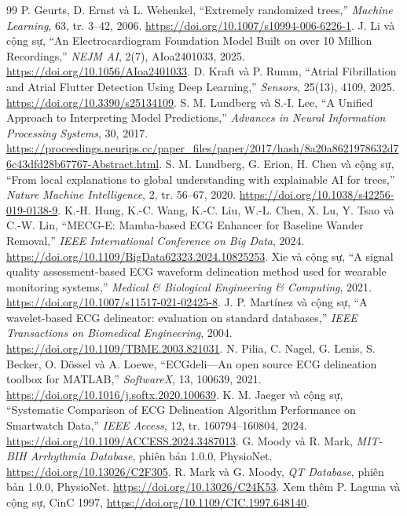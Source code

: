 \documentclass[12pt,a4paper,oneside]{report}
\begin{document}
\begin{thebibliography}{99}
 P. Geurts, D. Ernst và L. Wehenkel, ``Extremely randomized trees,'' \emph{Machine Learning}, 63, tr. 3--42, 2006. \url{https://doi.org/10.1007/s10994-006-6226-1}.
 J. Li và cộng sự, ``An Electrocardiogram Foundation Model Built on over 10 Million Recordings,'' \emph{NEJM AI}, 2(7), AIoa2401033, 2025. \url{https://doi.org/10.1056/AIoa2401033}.
 D. Kraft và P. Rumm, ``Atrial Fibrillation and Atrial Flutter Detection Using Deep Learning,'' \emph{Sensors}, 25(13), 4109, 2025. \url{https://doi.org/10.3390/s25134109}.
 S. M. Lundberg và S.-I. Lee, ``A Unified Approach to Interpreting Model Predictions,'' \emph{Advances in Neural Information Processing Systems}, 30, 2017. \url{https://proceedings.neurips.cc/paper_files/paper/2017/hash/8a20a8621978632d76c43dfd28b67767-Abstract.html}.
 S. M. Lundberg, G. Erion, H. Chen và cộng sự, ``From local explanations to global understanding with explainable AI for trees,'' \emph{Nature Machine Intelligence}, 2, tr. 56--67, 2020. \url{https://doi.org/10.1038/s42256-019-0138-9}.
 K.-H. Hung, K.-C. Wang, K.-C. Liu, W.-L. Chen, X. Lu, Y. Tsao và C.-W. Lin, ``MECG-E: Mamba-based ECG Enhancer for Baseline Wander Removal,'' \emph{IEEE International Conference on Big Data}, 2024. \url{https://doi.org/10.1109/BigData62323.2024.10825253}.
 Xie và cộng sự, ``A signal quality assessment-based ECG waveform delineation method used for wearable monitoring systems,'' \emph{Medical \& Biological Engineering \& Computing}, 2021. \url{https://doi.org/10.1007/s11517-021-02425-8}.
 J. P. Martínez và cộng sự, ``A wavelet-based ECG delineator: evaluation on standard databases,'' \emph{IEEE Transactions on Biomedical Engineering}, 2004. \url{https://doi.org/10.1109/TBME.2003.821031}.
 N. Pilia, C. Nagel, G. Lenis, S. Becker, O. Dössel và A. Loewe, ``ECGdeli---An open source ECG delineation toolbox for MATLAB,'' \emph{SoftwareX}, 13, 100639, 2021. \url{https://doi.org/10.1016/j.softx.2020.100639}.
 K. M. Jaeger và cộng sự, ``Systematic Comparison of ECG Delineation Algorithm Performance on Smartwatch Data,'' \emph{IEEE Access}, 12, tr. 160794--160804, 2024. \url{https://doi.org/10.1109/ACCESS.2024.3487013}.
 G. Moody và R. Mark, \emph{MIT-BIH Arrhythmia Database}, phiên bản 1.0.0, PhysioNet. \url{https://doi.org/10.13026/C2F305}.
 R. Mark và G. Moody, \emph{QT Database}, phiên bản 1.0.0, PhysioNet. \url{https://doi.org/10.13026/C24K53}. Xem thêm P. Laguna và cộng sự, CinC 1997, \url{https://doi.org/10.1109/CIC.1997.648140}.

\end{thebibliography}
\end{document}
